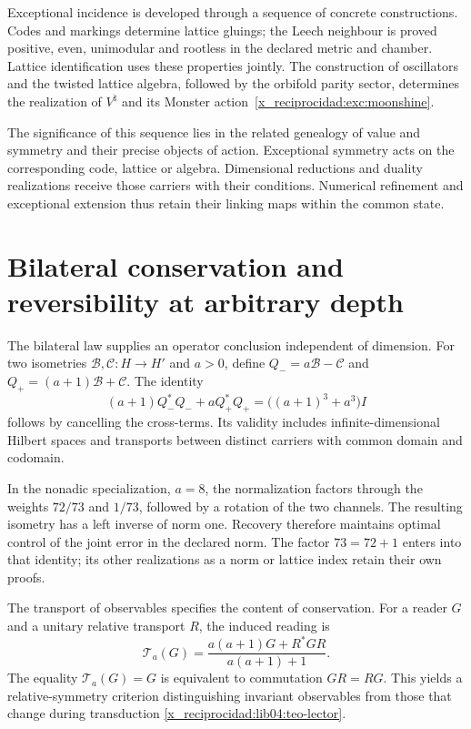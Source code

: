 Exceptional incidence is developed through a sequence of concrete constructions. Codes and markings determine lattice gluings; the Leech neighbour is proved positive, even, unimodular and rootless in the declared metric and chamber. Lattice identification uses these properties jointly. The construction of oscillators and the twisted lattice algebra, followed by the orbifold parity sector, determines the realization of \(V^\natural\) and its Monster action~\ref{x_reciprocidad:exc:moonshine}.

The significance of this sequence lies in the related genealogy of value and symmetry and their precise objects of action. Exceptional symmetry acts on the corresponding code, lattice or algebra. Dimensional reductions and duality realizations receive those carriers with their conditions. Numerical refinement and exceptional extension thus retain their linking maps within the common state.

\section{Bilateral conservation and reversibility at arbitrary depth}

The bilateral law supplies an operator conclusion independent of dimension. For two isometries \(\mathcal B,\mathcal C:H\to H'\) and \(a>0\), define \(Q_-=a\mathcal B-\mathcal C\) and \(Q_+=(a+1)\mathcal B+\mathcal C\). The identity
\[
 (a+1)Q_-^*Q_-+aQ_+^*Q_+
 =\bigl((a+1)^3+a^3\bigr)I
\]
follows by cancelling the cross-terms. Its validity includes infinite-dimensional Hilbert spaces and transports between distinct carriers with common domain and codomain.

In the nonadic specialization, \(a=8\), the normalization factors through the weights \(72/73\) and \(1/73\), followed by a rotation of the two channels. The resulting isometry has a left inverse of norm one. Recovery therefore maintains optimal control of the joint error in the declared norm. The factor \(73=72+1\) enters into that identity; its other realizations as a norm or lattice index retain their own proofs.

The transport of observables specifies the content of conservation. For a reader \(G\) and a unitary relative transport \(R\), the induced reading is
\[
 \mathcal T_a(G)=
 \frac{a(a+1)G+R^*GR}{a(a+1)+1}.
\]
The equality \(\mathcal T_a(G)=G\) is equivalent to commutation \(GR=RG\). This yields a relative-symmetry criterion distinguishing invariant observables from those that change during transduction \ref{x_reciprocidad:lib04:teo-lector}.


